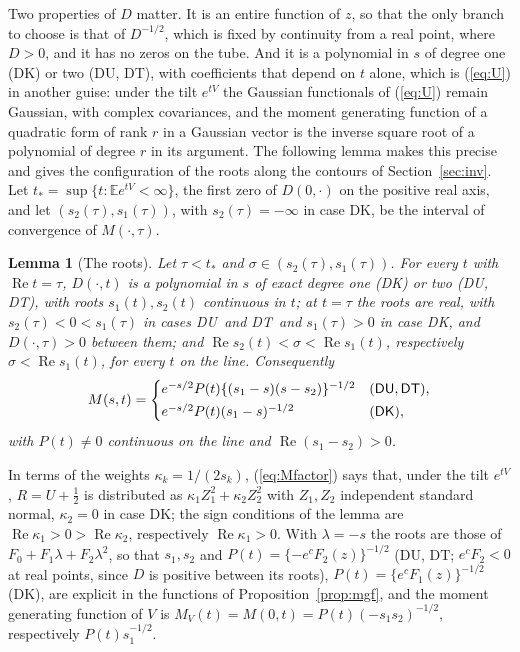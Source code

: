 \documentclass[ecta,nameyear,final]{econsocart}
\newcommand{\E}{{\mathbb E}}
\newcommand{\Rea}{\operatorname{Re}}
\newcommand{\Fk}{\textsf{\upshape DK}}
\newcommand{\Fu}{\textsf{\upshape DU}}
\newcommand{\Ft}{\textsf{\upshape DT}}
\theoremstyle{plain}
\newtheorem{lemma}{Lemma}
\theoremstyle{definition}
\begin{document}
Two properties of $D$ matter.  It is an entire function of $z$, so that the only branch to choose is that of $D^{-1/2}$, which is fixed by continuity from a real point, where $D>0$, and it has no zeros on the tube.  And it is a polynomial in $s$ of degree one (\Fk) or two (\Fu, \Ft), with coefficients that depend on $t$ alone, which is (\ref{eq:U}) in another guise: under the tilt $e^{tV}$ the Gaussian functionals of (\ref{eq:U}) remain Gaussian, with complex covariances, and the moment generating function of a quadratic form of rank $r$ in a Gaussian vector is the inverse square root of a polynomial of degree $r$ in its argument.  The following lemma makes this precise and gives the configuration of the roots along the contours of Section~\ref{sec:inv}.  Let $t_*=\sup\{t:\E e^{tV}<\infty\}$, the first zero of $D(0,\cdot)$ on the positive real axis, and let $(s_2(\tau),s_1(\tau))$, with $s_2(\tau)=-\infty$ in case \Fk, be the interval of convergence of $M(\cdot,\tau)$.

\begin{lemma}[The roots]
\label{lem:roots}
Let $\tau<t_*$ and $\sigma\in(s_2(\tau),s_1(\tau))$.  For every $t$ with $\Rea t=\tau$, $D(\cdot,t)$ is a polynomial in $s$ of exact degree one (\Fk) or two (\Fu, \Ft), with roots $s_1(t),s_2(t)$ continuous in $t$; at $t=\tau$ the roots are real, with $s_2(\tau)<0<s_1(\tau)$ in cases \Fu\ and \Ft\ and $s_1(\tau)>0$ in case \Fk, and $D(\cdot,\tau)>0$ between them; and $\Rea s_2(t)<\sigma<\Rea s_1(t)$, respectively $\sigma<\Rea s_1(t)$, for every $t$ on the line.  Consequently
\begin{equation}
M(s,t)=\begin{cases}e^{-s/2}P(t)\{(s_1-s)(s-s_2)\}^{-1/2}&(\Fu,\Ft),\\[0.5ex]
e^{-s/2}P(t)(s_1-s)^{-1/2}&(\Fk),\end{cases}
\label{eq:Mfactor}
\end{equation}
with $P(t)\ne0$ continuous on the line and $\Rea(s_1-s_2)>0$.
\end{lemma}

In terms of the weights $\kappa_k=1/(2s_k)$, (\ref{eq:Mfactor}) says that, under the tilt $e^{tV}$, $R=U+\frac12$ is distributed as $\kappa_1Z_1^2+\kappa_2Z_2^2$ with $Z_1,Z_2$ independent standard normal, $\kappa_2=0$ in case \Fk; the sign conditions of the lemma are $\Rea\kappa_1>0>\Rea\kappa_2$, respectively $\Rea\kappa_1>0$.  With $\lambda=-s$ the roots are those of $F_0+F_1\lambda+F_2\lambda^2$, so that $s_1,s_2$ and $P(t)=\{-e^cF_2(z)\}^{-1/2}$ (\Fu, \Ft; $e^cF_2<0$ at real points, since $D$ is positive between its roots), $P(t)=\{e^cF_1(z)\}^{-1/2}$ (\Fk), are explicit in the functions of Proposition~\ref{prop:mgf}, and the moment generating function of $V$ is $M_V(t)=M(0,t)=P(t)(-s_1s_2)^{-1/2}$, respectively $P(t)s_1^{-1/2}$.
\end{document}
